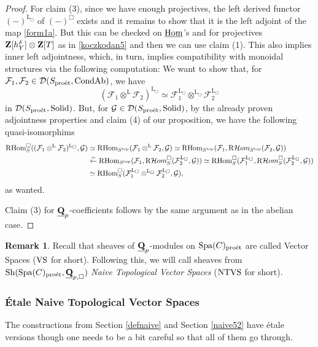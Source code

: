 \documentclass[10pt]{amsart}
\let\cal\mathcal
\theoremstyle{definition}
\newtheorem{remark}[equation]{Remark}
\theoremstyle{remark}
\newcommand{\proeet}{\operatorname{pro\acute{e}t} }
\newcommand{\Hom}{{\rm{Hom}} }
\newcommand{\uHom}{\underline{{\rm{Hom}} }}
\newcommand{\Hhom}{{\cal Hom}}
\newcommand{\LL}{\operatorname{L} }
\newcommand{\sff}{{\mathcal{F}}}
\newcommand{\sg}{{\mathcal{G}}}
\newcommand{\sd}{{\mathcal{D}}}
\numberwithin{equation}{section}
\def\R{{\mathrm R}}
\def\Q{{\bf Q}} \def\Z{{\bf Z}}
\numberwithin{equation}{section}
\begin{document}
\begin{proof}
  
   For claim (3), since we have enough projectives, the left derived functor $(-)^{\LL_{\Box}}$ of $(-)^{\Box}$ exists and it remains to show that it is the left adjoint of the map \eqref{form1a}. But this can be checked on  $\uHom$'s and for projectives $\Z[h^{\delta}_{Y}]\otimes\Z[T]$ as in \eqref{koczkodan5} and then we can use claim (1).
     This also  implies inner left adjointness, which, in turn, implies compatibility with monoidal structures via the following computation: We want to show that, for $\sff_1, \sff_2\in \sd(S_{\proeet},{\rm CondAb})$, we have 
   \begin{equation}\label{chicago1}
  ( \sff_1\otimes^{\LL}\sff_2)^{\LL_{\Box}}\simeq \sff_1^{\LL_{\Box}}\otimes^{\LL_{\Box}}\sff_2^{\LL_{\Box}}
   \end{equation}
   in $\sd(S_{\proeet}, {\rm Solid})$. 
   But, for $\sg\in\sd(S_{\proeet}, {\rm Solid})$, by the  already proven adjointness properties and claim (4) of our proposition, we have the following quasi-isomorphims
   \begin{align*}
   \R\Hom^{\Box}_{S}((\sff_1\otimes^{\LL}\sff_2)^{\LL_{\Box}},\sg) & \simeq  \R\Hom_{S^{\rm top}}(\sff_1\otimes^{\LL}\sff_2,\sg)\simeq \R\Hom_{S^{\rm top}}(\sff_1,\R\Hhom_{S^{\rm top}}(\sff_2,\sg))\\
    & \stackrel{\sim}{\leftarrow} \R\Hom_{S^{\rm top}}(\sff_1,\R\Hhom^{\Box}_{S}(\sff^{\LL_{\Box}}_2,\sg))
     \simeq  \R\Hom^{\Box}_{S}(\sff^{\LL_{\Box}}_1, \R\Hhom^{\Box}_{S}(\sff^{\LL_{\Box}}_2,\sg))   \\
      & \simeq  \R\Hom^{\Box}_{S}(\sff^{\LL_{\Box}}_1\otimes^{\LL_{\Box}}\sff^{\LL_{\Box}}_2,\sg),
   \end{align*}
   as wanted. 
  
    Claim (3)  for $\underline{\Q}_p$-coefficients follows by the same argument as in the abelian case. 
  \end{proof}
 
\begin{remark}  Recall that sheaves of $\underline{\Q}_p$-modules on ${\rm Spa}(C)_{\proeet}$ are called Vector Spaces (${\rm VS}$ for short). Following this, we will call sheaves from ${\rm Sh}({\rm Spa}(C)_{\proeet},\underline{\Q}_{p,\Box})$ {\em Naive Topological Vector Spaces} (${\rm NTVS}$ for short).
\end{remark}
\subsubsection{\'Etale Naive Topological Vector Spaces}  The constructions from Section \ref{defnaive} and Section \ref{naive52} have \'etale versions though one needs to be  a bit careful so that all of them go through. %
\end{document}

